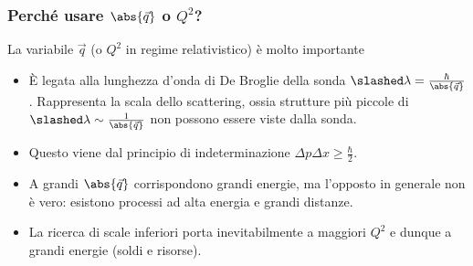 \subsubsection{Perché usare $\abs{\vec q}$ o $Q^2$?}
La variabile $\vec q$ (o $Q^2$ in regime relativistico) è molto importante
\begin{itemize}
    \item È legata alla lunghezza d'onda di De Broglie della sonda $\slashed\lambda=\frac\hbar{\abs{\vec q}}$. Rappresenta la scala dello scattering, ossia strutture più piccole di $\slashed\lambda\sim\frac1{\abs{\vec q}}$ non possono essere viste dalla sonda.
    \item Questo viene dal principio di indeterminazione $\Delta p\Delta x\geq \frac\hbar2$.
    \item A grandi $\abs{\vec q}$ corrispondono grandi energie, ma l'opposto in generale non è vero: esistono processi ad alta energia e grandi distanze.
    \item La ricerca di scale inferiori porta inevitabilmente a maggiori $Q^2$ e dunque a grandi energie (soldi e risorse). 
\end{itemize}
